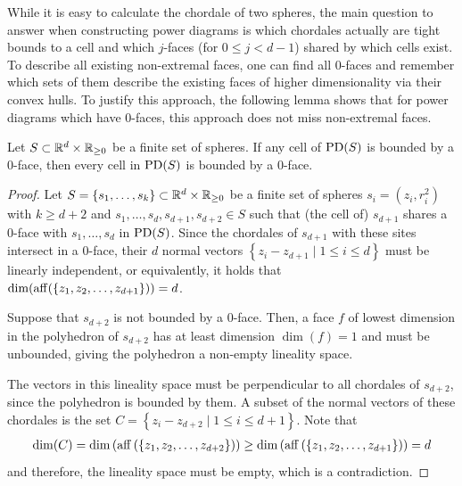 While it is easy to calculate the chordale of two spheres, the main question to answer when constructing power diagrams is which chordales actually are tight bounds to a cell and which $j$-faces (for $0 \leq j < d - 1$) shared by which cells exist.
To describe all existing non-extremal faces, one can find all $0$-faces and remember which sets of them describe the existing faces of higher dimensionality via their convex hulls.
To justify this approach, the following lemma shows that for power diagrams which have $0$-faces, this approach does not miss non-extremal faces.

\begin{lemma}
    \label{lem:zerofaces}
    Let $S \subset \mathbb{R}^d \times \mathbb{R}_{\geq 0}$ be a finite set of spheres.
    If any cell of $\operatorname{PD}(S)$ is bounded by a $0$-face, then every cell in $\operatorname{PD}(S)$ is bounded by a $0$-face.
\end{lemma}
\begin{proof}
    Let $S = \left\{ s_1, \dots, s_k \right\} \subset \mathbb{R}^d \times \mathbb{R}_{\geq 0}$ be a finite set of spheres $s_i = (z_i, r_i^2)$ with $k \geq d+2$ and $s_1, \dots, s_d, s_{d+1}, s_{d+2} \in S$ such that (the cell of) $s_{d+1}$ shares a $0$-face with $s_1, \dots, s_d$ in $\operatorname{PD}(S)$.
    Since the chordales of $s_{d+1}$ with these sites intersect in a $0$-face, their $d$ normal vectors $\left\{  z_i - z_{d+1} \mid 1 \leq i \leq d\right\}$ must be linearly independent, or equivalently, it holds that $\dim(\operatorname{aff}(\left\{ z_1, z_2, \dots, z_{d+1} \right\})) = d$.

    Suppose that $s_{d+2}$ is not bounded by a $0$-face.
    Then, a face $f$ of lowest dimension in the polyhedron of $s_{d+2}$ has at least dimension $\dim(f) = 1$ and must be unbounded, giving the polyhedron a non-empty lineality space.

    The vectors in this lineality space must be perpendicular to all chordales of $s_{d+2}$, since the polyhedron is bounded by them.
    A subset of the normal vectors of these chordales is the set $C = \left\{ z_i - z_{d+2} \mid 1 \leq i \leq d+1 \right\}$.
    Note that
    \begin{align}
        \dim(C) = \dim \left( \operatorname{aff} \left( \left\{ z_1, z_2, \dots, z_{d+2} \right\} \right) \right) \geq \dim \left( \operatorname{aff} \left( \left\{ z_1, z_2, \dots, z_{d+1} \right\} \right) \right) = d
    \end{align}
    and therefore, the lineality space must be empty, which is a contradiction.
\end{proof}

